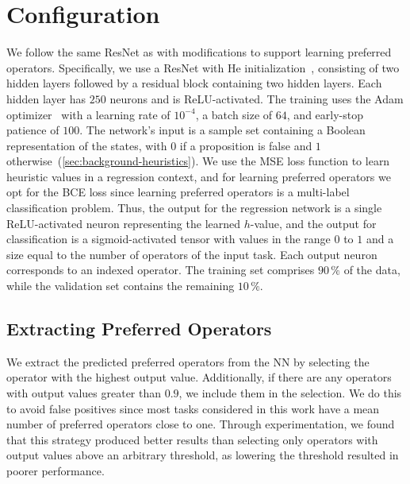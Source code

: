 \documentclass[ppgc,diss,english]{iiufrgs}
\begin{document}
\section{Configuration}
\label{sec:exp-configuration}
We follow the same ResNet as \citet{Bettker.etal/2022} with modifications to support learning preferred operators. Specifically, we use a ResNet with He initialization~\cite{He.etal/2015}, consisting of two hidden layers followed by a residual block containing two hidden layers.
Each hidden layer has $250$ neurons and is ReLU-activated.
The training uses the Adam optimizer~\cite{Kingma.Ba/2015} with a learning rate of $10^{-4}$, a batch size of $64$, and early-stop patience of $100$.
The network's input is a sample set containing a Boolean representation of the states, with $0$ if a proposition is false and $1$ otherwise~(\cref{sec:background-heuristics}).
We use the MSE loss function to learn heuristic values in a regression context, and for learning preferred operators we opt for the BCE loss since learning preferred operators is a multi-label classification problem.
Thus, the output for the regression network is a single ReLU-activated neuron representing the learned $h$-value, and the output for classification is a sigmoid-activated tensor with values in the range $0$ to $1$ and a size equal to the number of operators of the input task.
Each output neuron corresponds to an indexed operator. The training set comprises $90\,\%$ of the data, while the validation set contains the remaining $10\,\%$.


\subsection{Extracting Preferred Operators}
\label{sec:exp-extracting-pos}
We extract the predicted preferred operators from the NN by selecting the operator with the highest output value. Additionally, if there are any operators with output values greater than $0.9$, we include them in the selection. We do this to avoid false positives since most tasks considered in this work have a mean number of preferred operators close to one. Through experimentation, we found that this strategy produced better results than selecting only operators with output values above an arbitrary threshold, as lowering the threshold resulted in poorer performance.
\end{document}
